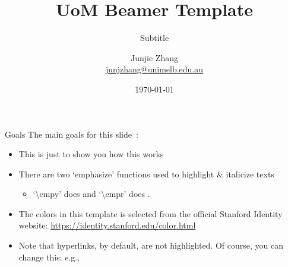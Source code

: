 \documentclass[pdf]{beamer} %
\title[In the footer]{UoM Beamer Template}
\subtitle{Subtitle}
\begin{document}
\author[J. Zhang, The University of Melbourne]{
	\begin{tabular}{c} 
		\Large Junjie Zhang\\
    \footnotesize \href{mailto:junjzhang@unimelb.edu.au}{junjzhang@unimelb.edu.au}
	\end{tabular}
\vspace{-2ex}}


\date{\today}

\begin{noheadline}
\begin{frame}\vspace{-1.8cm}\maketitle\end{frame}
\end{noheadline}



\begin{frame}{Goals}
The main goals for this slide~\cite{allis:91}:
\begin{itemize}
	\item This is just to show you how this  works
	\item There are two `emphasize' functions used to highlight \& italicize texts
	\begin{itemize}
		\item `\textbackslash empy' does  and `\textbackslash empr' does .
	\end{itemize}
	\item The colors in this template is selected from the official Stanford Identity website: \href{https://identity.stanford.edu/color.html}{https://identity.stanford.edu/color.html}
	\item Note that hyperlinks, by default, are not highlighted. Of course, you can change this: e.g., 
\end{itemize}
\end{frame}
\end{document}
